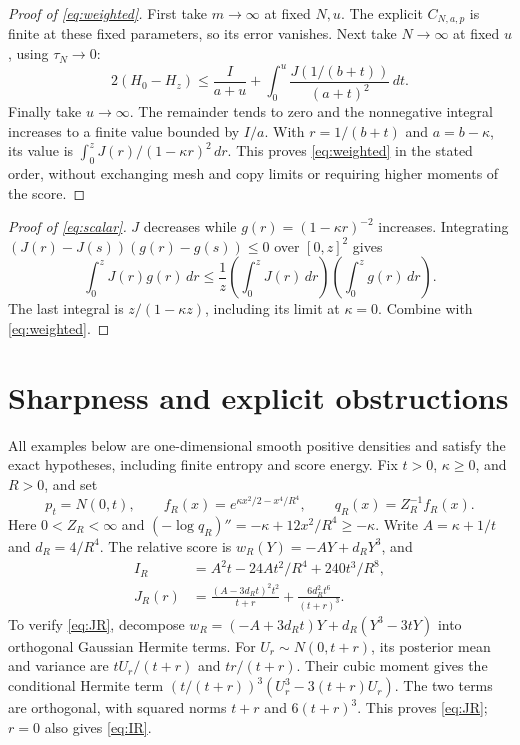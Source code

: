 \documentclass[11pt]{article}
\theoremstyle{remark}\newtheorem{remark}[theorem]{Remark}
\begin{document}
\begin{proof}[Proof of \eqref{eq:weighted}]
First take $m\to\infty$ at fixed $N,u$.
The explicit $C_{N,a,p}$ is finite at these fixed parameters, so its error
vanishes. Next take $N\to\infty$ at fixed $u$, using $\tau_N\to0$:
\[
2(H_0-H_z)\le\frac I{a+u}
+\int_0^u\frac{J(1/(b+t))}{(a+t)^2}\,dt.
\]
Finally take $u\to\infty$. The remainder tends to zero and the nonnegative
integral increases to a finite value bounded by $I/a$.
With $r=1/(b+t)$ and $a=b-\kappa$, its value is
$\int_0^z J(r)/(1-\kappa r)^2\,dr$.
This proves \eqref{eq:weighted} in the stated order, without exchanging
mesh and copy limits or requiring higher moments of the score.
\end{proof}

\begin{proof}[Proof of \eqref{eq:scalar}]
$J$ decreases while $g(r)=(1-\kappa r)^{-2}$ increases.
Integrating
$(J(r)-J(s))(g(r)-g(s))\le0$ over $[0,z]^2$ gives
\[
\int_0^zJ(r)g(r)\,dr
\le\frac1z\left(\int_0^zJ(r)\,dr\right)
\left(\int_0^zg(r)\,dr\right).
\]
The last integral is $z/(1-\kappa z)$, including its limit at $\kappa=0$.
Combine with \eqref{eq:weighted}.
\end{proof}

\section{Sharpness and explicit obstructions}
All examples below are one-dimensional smooth positive densities and satisfy
the exact hypotheses, including finite entropy and score energy.
Fix $t>0$, $\kappa\ge0$, and $R>0$, and set
\[
p_t=N(0,t),\qquad
f_R(x)=e^{\kappa x^2/2-x^4/R^4},\qquad
q_R(x)=Z_R^{-1}f_R(x).
\]
Here $0<Z_R<\infty$ and
$(-\log q_R)''=-\kappa+12x^2/R^4\ge-\kappa$.
Write $A=\kappa+1/t$ and $d_R=4/R^4$. The relative score is
$w_R(Y)=-AY+d_RY^3$, and
\begin{align}
I_R&=A^2t-24At^2/R^4+240t^3/R^8,\label{eq:IR}\\
J_R(r)&=\frac{(A-3d_Rt)^2t^2}{t+r}
+\frac{6d_R^2t^6}{(t+r)^3}. \label{eq:JR}
\end{align}
To verify \eqref{eq:JR}, decompose
$w_R=(-A+3d_Rt)Y+d_R(Y^3-3tY)$ into orthogonal Gaussian Hermite terms.
For $U_r\sim N(0,t+r)$, its posterior mean and variance are
$tU_r/(t+r)$ and $tr/(t+r)$.
Their cubic moment gives the conditional Hermite term
$(t/(t+r))^3(U_r^3-3(t+r)U_r)$.
The two terms are orthogonal, with squared norms $t+r$ and $6(t+r)^3$.
This proves \eqref{eq:JR}; $r=0$ also gives \eqref{eq:IR}.
\end{document}
